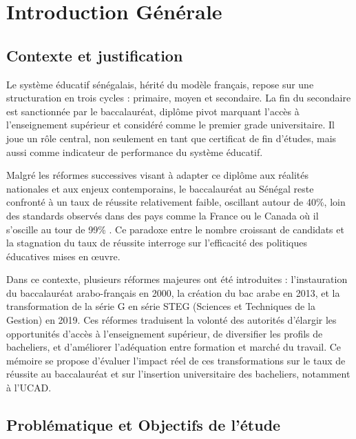 \chapter*{Introduction Générale}

\section*{Contexte et justification}

Le système éducatif sénégalais, hérité du modèle français, repose sur une structuration en trois cycles : primaire, moyen et secondaire. 
La fin du secondaire est sanctionnée par le baccalauréat, diplôme pivot marquant l'accès à l'enseignement supérieur et considéré comme le premier grade universitaire. 
Il joue un rôle central, non seulement en tant que certificat de fin d’études, mais aussi comme indicateur de performance du système éducatif.

Malgré les réformes successives visant à adapter ce diplôme aux réalités nationales et aux enjeux contemporains, le baccalauréat au Sénégal reste confronté à un taux de réussite relativement faible, 
oscillant autour de 40\%, loin des standards observés dans des pays comme la France ou le Canada où il s'oscille au tour de 99\% \cite{Mbaye2023}. 
Ce paradoxe entre le nombre croissant de candidats et la stagnation du taux de réussite interroge sur l’efficacité des politiques éducatives mises en œuvre.

Dans ce contexte, plusieurs réformes majeures ont été introduites : l’instauration du baccalauréat arabo-français en 2000, la création du bac arabe en 2013, 
et la transformation de la série G en série STEG (Sciences et Techniques de la Gestion) en 2019. 
Ces réformes traduisent la volonté des autorités d’élargir les opportunités d’accès à l’enseignement supérieur, de diversifier les profils de bacheliers, 
et d'améliorer l'adéquation entre formation et marché du travail. Ce mémoire se propose d’évaluer l’impact réel de ces transformations sur le taux de réussite au baccalauréat et sur l’insertion universitaire des bacheliers, notamment à l'UCAD.

\section*{Problématique et Objectifs de l'étude}


